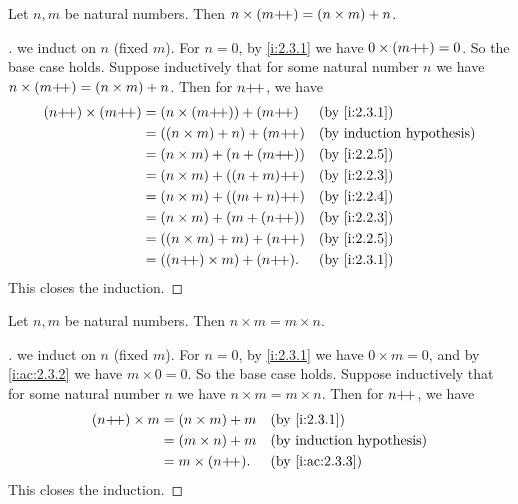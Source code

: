 \begin{ac}\label{i:ac:2.3.3}
  Let \(n, m\) be natural numbers.
  Then \(n \times (m{+}\!{+}) = (n \times m) + n\).
\end{ac}

\begin{proof}[]
  we induct on \(n\) (fixed \(m\)).
  For \(n = 0\), by \cref{i:2.3.1} we have \(0 \times (m{+}\!{+}) = 0\).
  So the base case holds.
  Suppose inductively that for some natural number \(n\) we have \(n \times (m{+}\!{+}) = (n \times m) + n\).
  Then for \(n{+}\!{+}\), we have
  \begin{align*}
    (n\pp) \times (m\pp)
     & = (n \times (m\pp)) + (m\pp)  &  & \by{i:2.3.1} \\
     & = ((n \times m) + n) + (m\pp) &  & \byIH        \\
     & = (n \times m) + (n + (m\pp)) &  & \by{i:2.2.5} \\
     & = (n \times m) + ((n + m)\pp) &  & \by{i:2.2.3} \\
     & = (n \times m) + ((m + n)\pp) &  & \by{i:2.2.4} \\
     & = (n \times m) + (m + (n\pp)) &  & \by{i:2.2.3} \\
     & = ((n \times m) + m) + (n\pp) &  & \by{i:2.2.5} \\
     & = ((n\pp) \times m) + (n\pp). &  & \by{i:2.3.1}
  \end{align*}
  This closes the induction.
\end{proof}

\begin{lem}\label{i:2.3.2}
  Let \(n, m\) be natural numbers.
  Then \(n \times m = m \times n\).
\end{lem}

\begin{proof}[]
  we induct on \(n\) (fixed \(m\)).
  For \(n = 0\), by \cref{i:2.3.1} we have \(0 \times m = 0\), and by \cref{i:ac:2.3.2} we have \(m \times 0 = 0\).
  So the base case holds.
  Suppose inductively that for some natural number \(n\) we have \(n \times m = m \times n\).
  Then for \(n{+}\!{+}\), we have
  \begin{align*}
    (n\pp) \times m & = (n \times m) + m &  & \by{i:2.3.1}    \\
                    & = (m \times n) + m &  & \byIH           \\
                    & = m \times (n\pp). &  & \by{i:ac:2.3.3}
  \end{align*}
  This closes the induction.
\end{proof}

